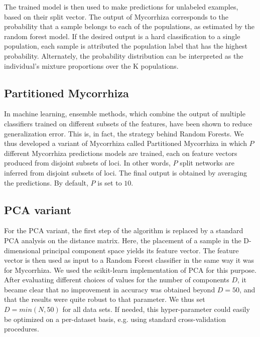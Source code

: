 \documentclass{bioinfo}
\begin{document}
\begin{methods}
The trained model is then used to make predictions for unlabeled examples, based on their split vector. The output of Mycorrhiza corresponds to the probability that a sample belongs to each of the  populations, as estimated by the random forest model. If the desired output is a hard classification to a single population, each sample is attributed the population label that has the highest probability. Alternately, the probability distribution can be interpreted as the individual's mixture proportions over the K populations.
\subsection{Partitioned Mycorrhiza}
In machine learning, ensemble methods, which combine the output of multiple classifiers trained on different subsets of the features, have been shown to reduce generalization error. This is, in fact, the strategy behind Random Forests. We thus developed a variant of Mycorrhiza called Partitioned Mycorrhiza in which $P$ different Mycorrhiza predictions models are trained, each on feature vectors produced from disjoint subsets of loci. In other words, $P$ split networks are inferred from disjoint subsets of loci. The final output is obtained by averaging the  predictions. By default, $P$ is set to $10$.
\subsection{PCA variant}
For the PCA variant, the first step of the algorithm is replaced by a standard PCA analysis on the distance matrix. Here, the placement of a sample in the D-dimensional principal component space yields its feature vector. The feature vector is then used as input to a Random Forest classifier in the same way it was for Mycorrhiza. We used the scikit-learn implementation of PCA for this purpose. After evaluating different choices of values for the number of components $D$, it became clear that no improvement in accuracy was obtained beyond $D=50$, and that the results were quite robust to that parameter. We thus set $D = min(N, 50)$ for all data sets. If needed, this hyper-parameter could easily be optimized on a per-dataset basis, e.g. using standard cross-validation procedures.

\end{methods}
\end{document}
